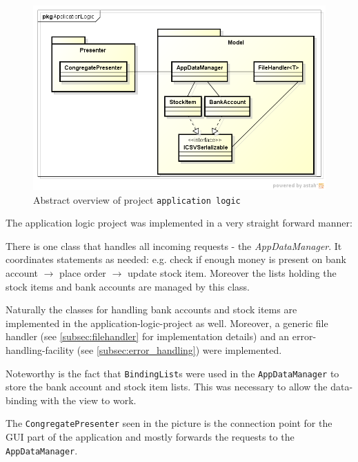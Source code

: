 \begin{figure}[H]
\begin{center}
\includegraphics[width=\textwidth]{gfx/application_logic.png}
\caption{Abstract overview of project \texttt{application logic}}
\label{fig:application_logic}
\end{center}
\end{figure}

The application logic project was implemented in a very straight forward manner:

There is one class that handles all incoming requests - the \textit{AppDataManager}. 
It coordinates statements as needed: e.g. check if enough money is present on bank account $\rightarrow$ place order $\rightarrow$ update stock item.
Moreover the lists holding the stock items and bank accounts are managed by this class.

Naturally the classes for handling bank accounts and stock items are implemented in the application-logic-project as well. Moreover, a generic file handler (see \autoref{subsec:filehandler} for implementation details) and an error-handling-facility (see \autoref{subsec:error_handling}) were implemented.

Noteworthy is the fact that \texttt{BindingList}s were used in the \texttt{AppDataManager} to store the bank account and stock item lists. This was necessary to allow the data-binding with the view to work.

The \texttt{CongregatePresenter} seen in the picture is the connection point for the \ac{GUI} part of the application and mostly forwards the requests to the \texttt{AppDataManager}.